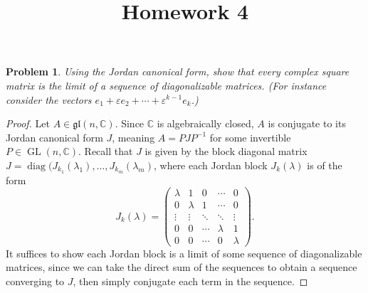 \documentclass[11pt, letterpaper]{article}
\title{Homework 4}
\theoremstyle{plain}
\newtheorem{problem}{Problem}
\begin{document}
\makeproblem

\begin{problem}\label{1}
	Using the Jordan canonical form, show that every complex square matrix is the limit of a sequence of diagonalizable matrices. (For instance consider the vectors $e_1 + \varepsilon e_2 + \cdots + \varepsilon ^{k-1} e_k$.)
\end{problem}

\begin{proof}
	Let $A\in \mathfrak{gl} (n,\mathbb{C} )$. Since $\mathbb{C} $ is algebraically closed, $A$ is conjugate to its Jordan canonical form $J$, meaning $A=PJP ^{-1} $ for some invertible $P\in \operatorname{GL} (n,\mathbb{C} )$. Recall that $J$ is given by the block diagonal matrix $J = \operatorname{diag} (J_{k_1} (\lambda _1), \ldots ,J_{k_m} (\lambda _m)$, where each Jordan block $J_{k} (\lambda )$ is of the form
	\[
		J_k(\lambda )= \begin{pmatrix}
		\lambda  & 1 & 0 & \cdots  & 0 \\
		0 & \lambda  & 1 & \cdots  & 0 \\
		\vdots & \vdots & \ddots & \ddots & \vdots \\
		0 & 0 & \cdots  & \lambda  & 1 \\
		0 & 0 & \cdots  & 0 & \lambda 
		\end{pmatrix}
	.\]
	It suffices to show each Jordan block is a limit of some sequence of diagonalizable matrices, since we can take the direct sum of the sequences to obtain a sequence converging to $J$, then simply conjugate each term in the sequence.


\end{proof}
\end{document}

